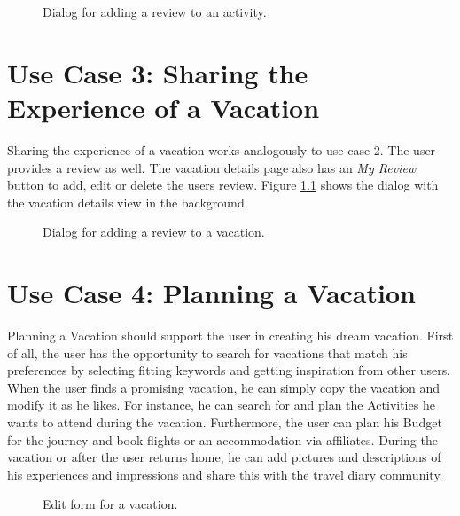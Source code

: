 \documentclass[IN,english]{tumbook}
\begin{document}
\begin{figure}
	
	\caption{Dialog for adding a review to an activity.}
	\label{fig:dialog-activity-review}
\end{figure}

\chapter{Use Case 3: Sharing the Experience of a Vacation}

Sharing the experience of a vacation works analogously to use case 2. The user provides a review as well. The vacation details page also has an \emph{My Review} button to add, edit or delete the users review. Figure \ref{fig:dialog-vacation-review} shows the dialog with the vacation details view in the background.

\begin{figure}
	
	\caption{Dialog for adding a review to a vacation.}
	\label{fig:dialog-vacation-review}
\end{figure}

\chapter{Use Case 4: Planning a Vacation}
Planning a Vacation should support the user in creating his dream vacation. First of all, the user has the opportunity to search for vacations that match his preferences by selecting fitting keywords and getting inspiration from other users. When the user finds a promising vacation, he can simply copy the vacation and modify it as he likes. For instance, he can search for and plan the Activities he wants to attend during the vacation. Furthermore, the user can plan his Budget for the journey and book flights or an accommodation via affiliates.
During the vacation or after the user returns home, he can add pictures and descriptions of his experiences and impressions and share this with the travel diary community.


\begin{figure}
	
	\caption{Edit form for a vacation.}
\end{figure}
\end{document}
